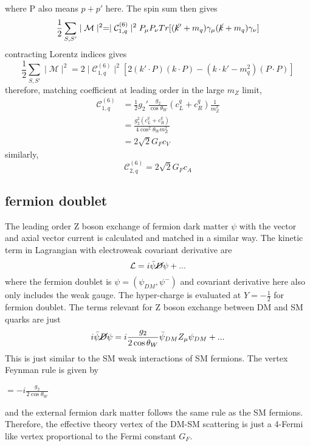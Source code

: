\documentclass[12pt]{article}
\begin{document}
where P also means $p+p'$ here. The spin sum then gives
$$
\frac{1}{2}\sum_{S,S'} \mid \mathcal M \mid ^2 = 
 \mid \mathcal  C_{1,q}^{(6)}  \mid^2 P_\mu P_\nu Tr[(\cancel k'+m_q)  \gamma_\mu (\cancel k+m_q) \gamma_\nu]
$$
contracting Lorentz indices gives
$$
\frac{1}{2}\sum_{S,S'} \mid \mathcal M \mid ^2 =
2 \mid \mathcal  C_{1,q}^{(6)}  \mid^2 [ 2(k' \cdot P)(k \cdot P)-( k \cdot k' - m_q^2)(P \cdot P )]
$$
therefore, matching coefficient at leading order in the large $m_Z$ limit, 
\begin{equation}
\begin{aligned}
   \mathcal  C_{1,q}^{(6)} 
 &
=   \frac{1}{2} g_2' \frac{g_2}{\cos \theta_W}( c_L^{q}+c_R^{q}) \frac{1}{m_Z^2}\\
& = \frac{g_2^2 ( c_L^{q}+c_R^{q}) }{4\cos^2\theta_Wm_Z^2}\\
&= 2\sqrt 2 G_F c_V
 \end{aligned}
 \end{equation}
 similarly, 
 $$
 \mathcal  C_{2,q}^{(6)}  = 2\sqrt 2 G_F c_A
$$

\subsection{fermion doublet}
The leading order Z boson exchange of fermion dark matter $\psi$ with the vector and axial vector current is calculated and matched in a similar way. The kinetic term in Lagrangian with electroweak covariant derivative are
$$
\mathcal L = i \bar \psi \cancel D \psi + ...
$$
where the fermion doublet is $\psi = ( \psi_{DM} , \psi^-)$ and covariant derivative here also only includes the weak gauge.  The hyper-charge is evaluated at $Y=-\frac{1}{2} $ for fermion doublet. The terms relevant for Z boson exchange between DM and SM quarks are just 
$$
i  \bar \psi \cancel D \psi  = i \frac{g_2}{2\cos \theta_W}  \bar \psi_{DM} Z_\mu \psi_{DM} + ...
$$
This is just similar to the SM weak interactions of SM fermions. The vertex Feynman rule is given by
\begin{center}
$= - i\frac{ g_2 }{2 \cos \theta_W}  $
\end{center}
and the external fermion dark matter follows the same rule as the SM fermions. 
Therefore, the effective theory vertex of the DM-SM scattering is just a 4-Fermi like vertex proportional to the Fermi constant $G_F$. 
\end{document}
